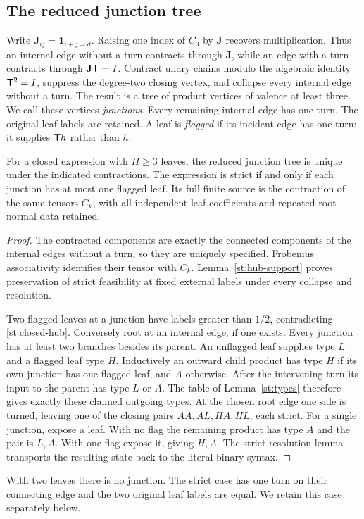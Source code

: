 \subsection{The reduced junction tree}
Write $\mathbf J_{ij}=\mathbf1_{i+j=d}$. Raising one index of
$C_3$ by $\mathbf J$ recovers multiplication. Thus an internal
edge without a turn contracts through $\mathbf J$, while an
edge with a turn contracts through $\mathbf J\mathsf T=I$.
Contract unary chains modulo the algebraic identity $\mathsf T^2=I$,
suppress the degree-two closing vertex, and collapse every
internal edge without a turn. The result is a tree of
product vertices of valence at least three. We call these
vertices \emph{junctions}. Every remaining internal edge
has one turn. The original leaf labels are retained.
A leaf is \emph{flagged} if its incident edge has one turn:
it supplies $\mathsf T h$ rather than $h$.

\begin{theorem}\label{st:reduced-junctions}
For a closed expression with $H\ge3$ leaves, the reduced
junction tree is unique under the indicated contractions.
The expression is strict if and only if each junction has
at most one flagged leaf. Its full finite source is the
contraction of the same tensors $C_k$, with all independent
leaf coefficients and repeated-root normal data retained.
\end{theorem}
\begin{proof}
The contracted components are exactly the connected components
of the internal edges without a turn, so they are uniquely
specified. Frobenius associativity identifies their tensor
with $C_k$. Lemma~\ref{st:hub-support} proves preservation of
strict feasibility at fixed external labels under every
collapse and resolution.

Two flagged leaves at a junction have labels greater than
$1/2$, contradicting \eqref{st:closed-hub}.
Conversely root at an internal edge, if one exists.
Every junction has at least two branches besides its parent.
An unflagged leaf supplies type $L$ and a flagged leaf type
$H$. Inductively an outward child product has type $H$ if
its own junction has one flagged leaf, and $A$ otherwise.
After the intervening turn its input to the parent has
type $L$ or $A$. The table of Lemma~\ref{st:types} therefore
gives exactly these claimed outgoing types. At the chosen
root edge one side is turned, leaving one of the closing
pairs $AA,AL,HA,HL$, each strict.
For a single junction, expose a leaf. With no flag the
remaining product has type $A$ and the pair is $L,A$.
With one flag expose it, giving $H,A$. The strict resolution
lemma transports the resulting state back to the literal
binary syntax.
\end{proof}
With two leaves there is no junction. The strict case has
one turn on their connecting edge and the two original leaf
labels are equal. We retain this case separately below.


